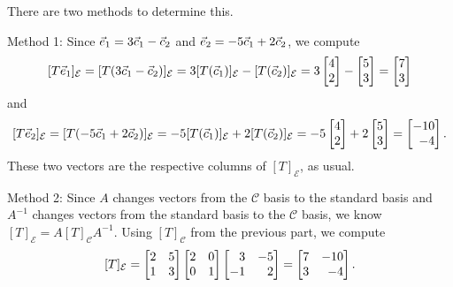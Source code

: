\documentclass{workbook}
\begin{document}
\begin{slide}
\begin{parts}[resume]
\begin{solution}
				There are two methods to determine this.

				Method 1:
				Since ${\vec e_1}=3\vec c_1-\vec c_2$ and ${\vec e_2}=-5\vec c_1+2\vec c_2$,
				we compute
				\[
					[T\xhat]_{\mathcal E}
					=[T(3\vec c_1-\vec c_2)]_{\mathcal E}
					=3[T(\vec c_1)]_{\mathcal E}-[T(\vec c_2)]_{\mathcal E}
					=3\mat{4\\2}-\mat{5\\3}
					=\mat{7\\3}
				\]
				and
				\[
					[T\yhat]_{\mathcal E}
					=[T(-5\vec c_1+2\vec c_2)]_{\mathcal E}
					=-5[T(\vec c_1)]_{\mathcal E}+2[T(\vec c_2)]_{\mathcal E}
					=-5\mat{4\\2}+2\mat{5\\3}
					=\mat{-10\\-4}.
				\]
				These two vectors are the respective columns of $[T]_{\mathcal E}$,
				as usual.

				Method 2:
				Since $A$ changes vectors from the $\mathcal C$ basis to the standard
				basis and $A^{-1}$ changes vectors from the standard basis to the
				$\mathcal C$ basis, we know $[T]_{\mathcal E} = A[T]_{\mathcal C}A^{-1}$.
				Using $[T]_{\mathcal C}$ from the previous part, we compute
				\[
					[T]_{\mathcal E}
					=\mat{2&5\\1&3}\mat{2&0\\0&1}\mat{3&-5\\-1&2}
					=\mat{7&-10\\3&-4}.
				\]


			\end{solution}
	\end{parts}


\end{slide}
\end{document}
